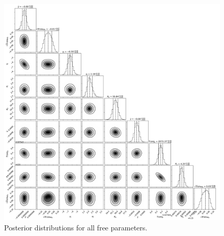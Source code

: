 \documentclass{emulateapj}
\begin{document}
\begin{figure}[!h]
\centering
\includegraphics[width=6.5in]{HD217014_corner.pdf}
\caption{Posterior distributions for all free parameters.}
\end{figure}
\end{document}
